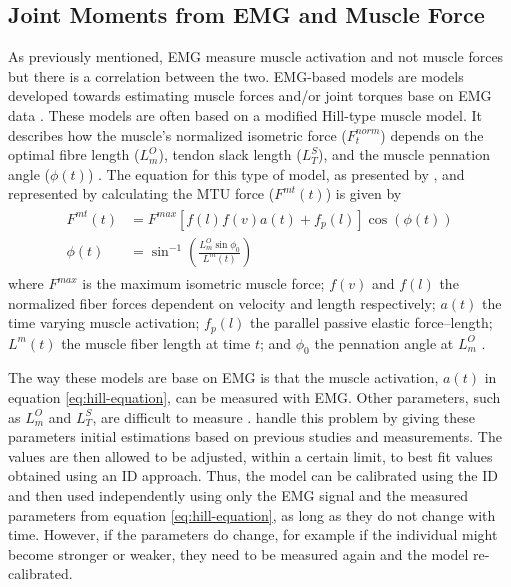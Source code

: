 \documentclass[../main.tex]{subfiles}
\begin{document}
\subsection{Joint Moments from \ac{EMG} and Muscle Force}
\label{sec:A-EMGBasedModels}
As previously mentioned, \ac{EMG} measure muscle activation and not muscle forces but there is a correlation between the two.
\ac{EMG}-based models are models developed towards estimating muscle forces and/or joint torques base on \ac{EMG} data \cite{Erdemir2007, Pizzolato2015}.
These models are often based on a modified Hill-type muscle model. 
It describes how the muscle's normalized isometric force  ($F^{norm}_t$) depends on the optimal fibre length ($L^O_m$), tendon slack length ($L^S_T$), and the muscle pennation angle ($\phi (t)$) \cite{Winby2008, Lloyd2003}.
The equation for this type of model, as presented by \textcite{Lloyd2003}, and represented by calculating the \ac{MTU} force ($F^{mt}(t)$) is given by
\begin{align}
\label{eq:hill-equation}
\begin{split}
    F^{mt}(t) &= F^{max} \left[ f(l)f(v)a(t) + f_p(l) \right] \cos{\left(\phi (t)\right)} \\
    \phi (t) &= \sin^{-1}\left( \frac{L^O_m\sin{\phi_0}}{L^m(t)}\right)
\end{split}
\end{align}
where $F^{max}$ is the maximum isometric muscle force; $f(v)$ and $f(l)$ the normalized fiber forces dependent on velocity and length respectively; $a(t)$ the time varying muscle activation; $f_p(l)$ the parallel passive elastic force–length; $L^m(t)$ the muscle fiber length at time $t$; and $\phi_0$ the pennation angle at $L^O_m$ \cite{Buchanan2004, Winby2008, Lloyd2003}.

The way these models are base on \ac{EMG} is that the muscle activation, $a(t)$ in equation \ref{eq:hill-equation}, can be measured with \ac{EMG}.
Other parameters, such as $L^O_m$ and $L^S_T$, are difficult to measure \cite{Winby2008}.
\textcite{Lloyd2003} handle this problem by giving these parameters initial estimations based on previous studies and measurements. 
The values are then allowed to be adjusted, within a certain limit, to best fit values obtained using an \ac{ID} approach.
Thus, the model can be calibrated using the \ac{ID} and then used independently using only the \ac{EMG} signal and the measured parameters from equation \ref{eq:hill-equation}, as long as they do not change with time.
However, if the parameters do change, for example if the individual might become stronger or weaker, they need to be measured again and the model re-calibrated.
\end{document}
